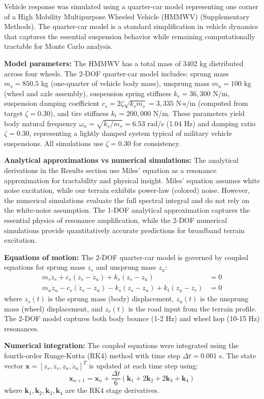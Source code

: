 \documentclass[11pt]{article}
\begin{document}
Vehicle response was simulated using a quarter-car model representing one corner of a High Mobility Multipurpose Wheeled Vehicle (HMMWV) (Supplementary Methods). The quarter-car model is a standard simplification in vehicle dynamics that captures the essential suspension behavior while remaining computationally tractable for Monte Carlo analysis.

\textbf{Model parameters:} The HMMWV has a total mass of 3402 kg distributed across four wheels. The 2-DOF quarter-car model includes: sprung mass $m_s = 850.5$ kg (one-quarter of vehicle body mass), unsprung mass $m_u = 100$ kg (wheel and axle assembly), suspension spring stiffness $k_s = 36,300$ N/m, suspension damping coefficient $c_s = 2\zeta\sqrt{k_s m_s} = 3,335$ N$\cdot$s/m (computed from target $\zeta = 0.30$), and tire stiffness $k_t = 200,000$ N/m. These parameters yield body natural frequency $\omega_n = \sqrt{k_s/m_s} = 6.53$ rad/s (1.04 Hz) and damping ratio $\zeta = 0.30$, representing a lightly damped system typical of military vehicle suspensions. All simulations use $\zeta = 0.30$ for consistency.


\textbf{Analytical approximations vs numerical simulations:} The analytical derivations in the Results section use Miles' equation as a resonance approximation for tractability and physical insight. Miles' equation assumes white noise excitation, while our terrain exhibits power-law (colored) noise. However, the numerical simulations evaluate the full spectral integral and do not rely on the white-noise assumption. The 1-DOF analytical approximation captures the essential physics of resonance amplification, while the 2-DOF numerical simulations provide quantitatively accurate predictions for broadband terrain excitation.

\textbf{Equations of motion:} The 2-DOF quarter-car model is governed by coupled equations for sprung mass $z_s$ and unsprung mass $z_u$:
\begin{align}
m_s \ddot{z}_s + c_s (\dot{z}_s - \dot{z}_u) + k_s (z_s - z_u) &= 0 \\
m_u \ddot{z}_u - c_s (\dot{z}_s - \dot{z}_u) - k_s (z_s - z_u) + k_t (z_u - z_r) &= 0
\end{align}
where $z_s(t)$ is the sprung mass (body) displacement, $z_u(t)$ is the unsprung mass (wheel) displacement, and $z_r(t)$ is the road input from the terrain profile. The 2-DOF model captures both body bounce (1-2 Hz) and wheel hop (10-15 Hz) resonances.

\textbf{Numerical integration:} The coupled equations were integrated using the fourth-order Runge-Kutta (RK4) method with time step $\Delta t = 0.001$ s. The state vector $\mathbf{x} = [z_s, \dot{z}_s, z_u, \dot{z}_u]^T$ is updated at each time step using:
\begin{equation}
\mathbf{x}_{n+1} = \mathbf{x}_n + \frac{\Delta t}{6}(\mathbf{k}_1 + 2\mathbf{k}_2 + 2\mathbf{k}_3 + \mathbf{k}_4)
\end{equation}
where $\mathbf{k}_1, \mathbf{k}_2, \mathbf{k}_3, \mathbf{k}_4$ are the RK4 stage derivatives.
\end{document}
